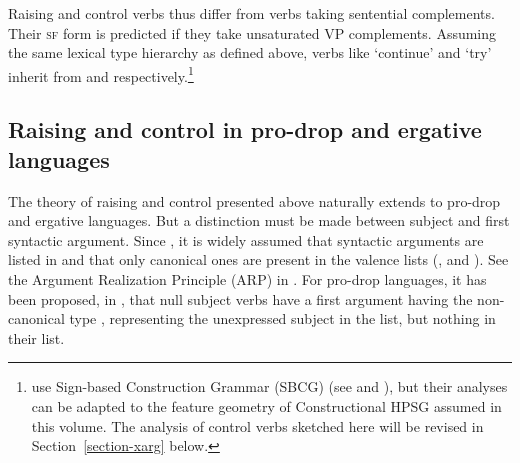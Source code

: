 Raising  and control verbs thus differ from verbs taking sentential complements. Their \textsc{sf} form is
predicted if they take unsaturated VP complements. Assuming the same lexical type hierarchy as
defined above, verbs like  `continue' and  `try' inherit from
 and 
 respectively.\footnote{\citeauthor{HenriandLaurens2011} use Sign-based Construction Grammar (SBCG) (see
   and
  ), but their analyses can be adapted to the
  feature geometry of Constructional HPSG \citep{Sag97a} assumed in this volume. The analysis of
  control verbs sketched here will be revised in Section~\ref{section-xarg} below.}


\subsection{Raising and control in pro-drop and ergative languages}

The theory of raising and control presented above naturally extends to pro-drop and ergative
languages.  But a distinction must be made between subject and first syntactic argument. Since \citet*{BMS2001a}, it is widely assumed
  that syntactic arguments are listed in \argst and
that only canonical ones are present in the valence lists (\subj, \spr and \comps). See the Argument Realization Principle (ARP) in \crossrefchapterw[\pageref{properties:ex-ARP}]{properties}.
For pro-drop languages,
it has been proposed, \eg in \citep[]{ManningandSag1998}, that null subject verbs have
a first argument having the non-canonical  type , representing the unexpressed subject in the \argst list, but nothing in
their \subj list.

